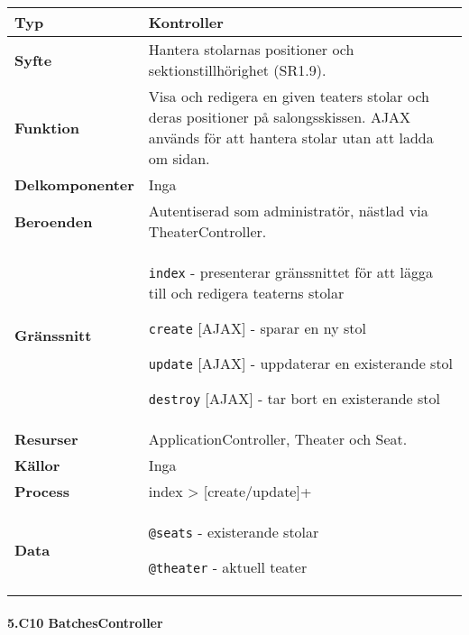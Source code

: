 \documentclass[a4paper, twoside, 11pt, titlepage]{article}
\begin{document}
			\begin {table} [ht] \begin{tabular} {  p{3.5cm} p{11.6cm} }
				\hline
				{\sffamily\textbf{Typ}} & {Kontroller} \\
				\hline
				{\sffamily\textbf{Syfte}} & {Hantera stolarnas positioner och sektionstillhörighet (SR1.9).} \\
				\hline
				{\sffamily\textbf{Funktion}} & {Visa och redigera en given teaters stolar och deras positioner på salongsskissen. AJAX används för att hantera stolar utan att ladda om sidan.} \\
				\hline
				{\sffamily\textbf{Delkomponenter}} & {Inga} \\
				\hline
				{\sffamily\textbf{Beroenden}} & {Autentiserad som administratör, nästlad via TheaterController.} \\
				\hline
				{\sffamily\textbf{Gränssnitt}} & {{\tt index} - presenterar gränssnittet för att lägga till och redigera teaterns stolar

{\tt create} [AJAX] - sparar en ny stol

{\tt update} [AJAX] - uppdaterar en existerande stol

{\tt destroy} [AJAX] - tar bort en existerande stol} \\
				\hline
				{\sffamily\textbf{Resurser}} & {ApplicationController, Theater och Seat.} \\
				\hline
				{\sffamily\textbf{Källor}} & {Inga} \\
				\hline
				{\sffamily\textbf{Process}} & {index > [create/update]+} \\
				\hline
				{\sffamily\textbf{Data}} & {{\tt @seats} - existerande stolar

{\tt @theater} - aktuell teater} \\
				\hline
			\end{tabular} \end{table} \FloatBarrier


			\paragraph{5.C10 BatchesController}\
\end{document}
